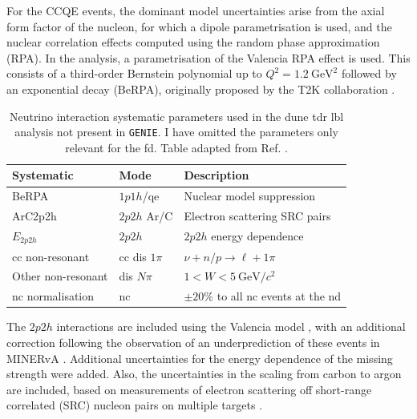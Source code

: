 For the CCQE events, the dominant model uncertainties arise from the axial form factor of the nucleon, for which a dipole parametrisation is used, and the nuclear correlation effects computed using the random phase approximation (RPA). In the analysis, a parametrisation of the Valencia RPA effect \cite{Nieves2011} is used. This consists of a third-order Bernstein polynomial up to $Q^{2} = 1.2 ~ \mathrm{GeV}^{2}$ followed by an exponential decay (BeRPA), originally proposed by the T2K collaboration \cite{T2K2018}.

\begin{table}[t]
	\caption[Neutrino interaction systematic parameters used in the \gls{dune} \gls{tdr} \gls{lbl} analysis not present in \texttt{GENIE}.]{Neutrino interaction systematic parameters used in the \gls{dune} \gls{tdr} \gls{lbl} analysis not present in \texttt{GENIE}. I have omitted the parameters only relevant for the \gls{fd}. Table adapted from Ref. \cite{DUNE2021}.}
	\begin{center}
		\begin{small}
			\begin{tabular}{l|l|l}
                Systematic         & Mode        & Description                         \\[2mm] \hline
                \rule{0pt}{1.1\normalbaselineskip}BeRPA              & $1p1h$/\gls{qe}   & Nuclear model suppression           \\[2mm]
                ArC2p2h            & $2p2h$ Ar/C   & Electron scattering SRC pairs       \\[2mm]
                $E_{2p2h}$         & $2p2h$        & $2p2h$ energy dependence            \\[2mm]
                \gls{cc} non-resonant    & \gls{cc} \gls{dis} $1\pi$ & $\nu + n/p \rightarrow \ell + 1\pi$ \\[2mm]
                Other non-resonant & \gls{dis} $N\pi$    & $1 < W < 5 ~ \mathrm{GeV}/c^{2}$    \\[2mm]
                \gls{nc} normalisation   & \gls{nc}            & $\pm 20\%$ to all \gls{nc} events at the \gls{nd}
            \end{tabular}
		\end{small}
	\end{center}
	\label{tab:xsec_non_genie_systs}
\end{table}

The $2p2h$ interactions are included using the Valencia model \cite{Nieves2011}, with an additional correction following the observation of an underprediction of these events in MINERvA \cite{MINERvA2015}. Additional uncertainties for the energy dependence of the missing strength were added. Also, the uncertainties in the scaling from carbon to argon are included, based on measurements of electron scattering off short-range correlated (SRC) nucleon pairs on multiple targets \cite{Colle2015}.

